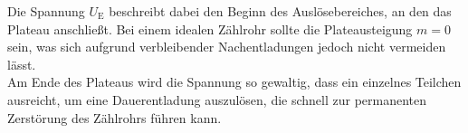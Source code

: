 Die Spannung $U_{\text{E}}$ beschreibt dabei
den Beginn des Auslösebereiches, an den das
Plateau anschließt.
Bei einem idealen Zählrohr sollte die Plateausteigung
$m = 0$ sein, was sich aufgrund verbleibender Nachentladungen
jedoch nicht vermeiden lässt. \\

Am Ende des Plateaus wird die Spannung so gewaltig,
dass ein einzelnes Teilchen ausreicht, um
eine Dauerentladung auszulösen, die schnell
zur permanenten Zerstörung des Zählrohrs führen kann.


